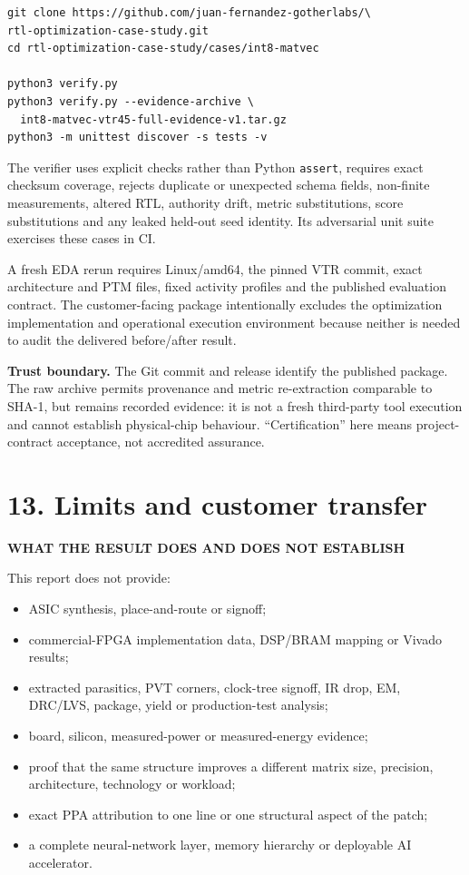 \documentclass[10pt,a4paper]{article}
\newcommand{\smallcaps}[1]{\textcolor{Mid}{\fontsize{8.5}{10}\selectfont\bfseries\MakeUppercase{#1}}}
\newcommand{\newpageheading}[2]{\clearpage\section{#1}\smallcaps{#2}\vspace{6pt}}
\begin{document}
\begin{lstlisting}
git clone https://github.com/juan-fernandez-gotherlabs/\
rtl-optimization-case-study.git
cd rtl-optimization-case-study/cases/int8-matvec

python3 verify.py
python3 verify.py --evidence-archive \
  int8-matvec-vtr45-full-evidence-v1.tar.gz
python3 -m unittest discover -s tests -v
\end{lstlisting}

The verifier uses explicit checks rather than Python \texttt{assert}, requires exact checksum coverage, rejects duplicate or unexpected schema fields, non-finite measurements, altered RTL, authority drift, metric substitutions, score substitutions and any leaked held-out seed identity. Its adversarial unit suite exercises these cases in CI.

A fresh EDA rerun requires Linux/amd64, the pinned VTR commit, exact architecture and PTM files, fixed activity profiles and the published evaluation contract. The customer-facing package intentionally excludes the optimization implementation and operational execution environment because neither is needed to audit the delivered before/after result.

\begin{scopebox}
\textbf{Trust boundary.} The Git commit and release identify the published package. The raw archive permits provenance and metric re-extraction comparable to SHA-1, but remains recorded evidence: it is not a fresh third-party tool execution and cannot establish physical-chip behaviour. ``Certification'' here means project-contract acceptance, not accredited assurance.
\end{scopebox}

\newpageheading{13. Limits and customer transfer}{What the result does and does not establish}

This report does not provide:
\begin{itemize}
  \item ASIC synthesis, place-and-route or signoff;
  \item commercial-FPGA implementation data, DSP/BRAM mapping or Vivado results;
  \item extracted parasitics, PVT corners, clock-tree signoff, IR drop, EM, DRC/LVS, package, yield or production-test analysis;
  \item board, silicon, measured-power or measured-energy evidence;
  \item proof that the same structure improves a different matrix size, precision, architecture, technology or workload;
  \item exact PPA attribution to one line or one structural aspect of the patch;
  \item a complete neural-network layer, memory hierarchy or deployable AI accelerator.
\end{itemize}
\end{document}
